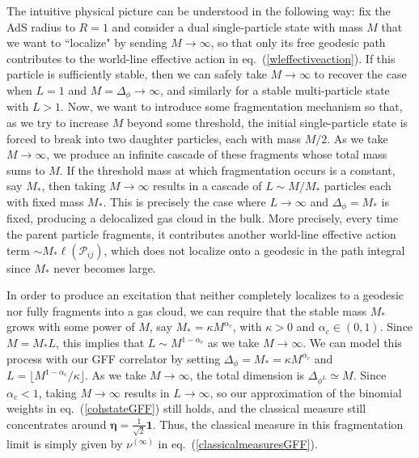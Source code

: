 \documentclass[a4paper,11pt]{article}
\theoremstyle{plain}
\theoremstyle{definition}
\theoremstyle{remark}
\newcommand{\bs}[1]{\boldsymbol{#1}}
\newcommand{\Df}{\Delta_\phi}
\newcommand{\De}{\Delta}
\begin{document}
The intuitive physical picture can be understood in the following way: fix the AdS radius to $R =1$ and consider a dual single-particle state with mass $M$ that we want to ``localize" by sending $M \to \infty$, so that only its free geodesic path contributes to the world-line effective action in eq.~(\ref{wleffectiveaction}). If this particle is sufficiently stable, then we can safely take $M\to\infty$ to recover the case when $L = 1$ and $M = \Df \to \infty$, and similarly for a stable multi-particle state with $L>1$. Now, we want to introduce some fragmentation mechanism so that, as we try to increase $M$ beyond some threshold, the initial single-particle state is forced to break into two daughter particles, each with mass $M/2$. As we take $M \to \infty$, we produce an infinite cascade of these fragments whose total mass sums to $M$. If the threshold mass at which fragmentation occurs is a constant, say $M_*$, then taking $M \to \infty$ results in a cascade of $L \sim M/M_*$ particles each with fixed mass $M_*$. This is precisely the case where $L \to \infty$ and $\Df = M_*$ is fixed, producing a delocalized gas cloud in the bulk. More precisely, every time the parent particle fragments, it contributes another world-line effective action term $\sim M_*  \ell(\mathcal{P}_{ij})$, which does not localize onto a geodesic in the path integral since $M_*$ never becomes large. 

In order to produce an excitation that neither completely localizes to a geodesic nor fully fragments into a gas cloud, we can require that the stable mass $M_*$ grows with some power of $M$, say $M_* = \kappa M^{\alpha_c}$, with $\kappa> 0$ and $\alpha_c \in (0,1)$. Since $M = M_* L$, this implies that $L \sim M^{1-\alpha_c}$ as we take $M \to \infty$. We can model this process with our GFF correlator by setting $\Df = M_* = \kappa M^{\alpha_c}$ and $L = \lfloor M^{1-\alpha_c}/\kappa\rfloor$. As we take $M \to \infty$, the total dimension is $\De_{\phi^L} \simeq M$. Since $\alpha_c <1$, taking $M\to\infty$ results in $L\to\infty$, so our approximation of the binomial weights in eq.~(\ref{cohstateGFF}) still holds, and the classical measure still concentrates around $\bs{\eta} = \frac{1}{\sqrt{2}} \bs{1}$. Thus, the classical measure in this fragmentation limit is simply given by $\nu^{(\infty)}$ in eq.~(\ref{classicalmeasuresGFF}). 
\end{document}
